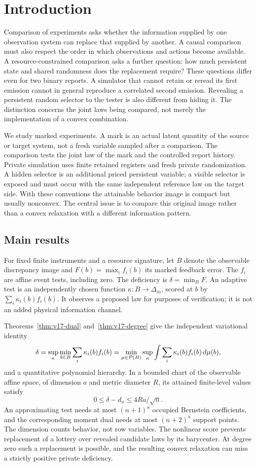 \section{Introduction}\label{sec:v17-introduction}

Comparison of experiments asks whether the information supplied by
one observation system can replace that supplied by another. A causal
comparison must also respect the order in which observations and
actions become available. A resource-constrained comparison asks a
further question: how much persistent state and shared randomness does
the replacement require? These questions differ even for two binary
reports. A simulator that cannot retain or reread its first emission
cannot in general reproduce a correlated second emission. Revealing a
persistent random selector to the tester is also different from hiding
it. The distinction concerns the joint laws being compared, not merely
the implementation of a convex combination.

We study marked experiments. A mark is an actual latent quantity of
the source or target system, not a fresh variable sampled after a
comparison. The comparison tests the joint law of the mark and the
controlled report history. Private simulation uses finite retained
registers and fresh private randomization. A hidden selector is an
additional priced persistent variable; a visible selector is exposed
and must occur with the same independent reference law on the target
side. With these conventions the attainable behavior image is compact
but usually nonconvex. The central issue is to compare this original
image rather than a convex relaxation with a different information
pattern.

\subsection{Main results}
For fixed finite instruments and a resource signature, let $B$ denote
the observable discrepancy image and $F(b)=\max_i f_i(b)$ its marked
feedback error. The $f_i$ are affine event tests, including zero.
The deficiency is $\delta=\min_B F$. An adaptive test is an independently
chosen function $\kappa:B\to\Delta_m$, scored at $b$ by
$\sum_i\kappa_i(b)f_i(b)$. It observes a proposed law for purposes of
verification; it is not an added physical information channel.

Theorems~\ref{thm:v17-dual} and~\ref{thm:v17-degree} give the
independent variational identity
\[
 \delta=\sup_\kappa\min_{b\in B}\sum_i\kappa_i(b)f_i(b)
       =\min_{\mu\in\mathcal P(B)}\sup_\kappa
                  \int\sum_i\kappa_i(b)f_i(b)\,d\mu(b),
\]
and a quantitative polynomial hierarchy. In a bounded chart of the
observable affine space, of dimension $a$ and metric diameter $R$,
its attained finite-level values satisfy
\[
 0\le\delta-d_n\le4Ra/\sqrt n.
\]
An approximating test needs at most $(n+1)^a$ occupied Bernstein
coefficients, and the corresponding moment dual needs at most
$(n+2)^a$ support points. The dimension counts behavior, not row
variables. The nonlinear score prevents replacement of a lottery over
revealed candidate laws by its barycenter. At degree zero such a
replacement is possible, and the resulting convex relaxation can
miss a strictly positive private deficiency.


